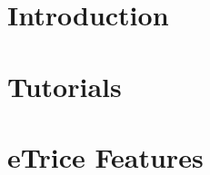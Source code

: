 \documentclass[a4paper,oneside,10pt]{book}
\title{\Huge \eTrice}
\author{\eTrice{} committers and contributors}
\begin{document}
\maketitle

\tableofcontents

\chapter{Introduction}




\chapter{Tutorials}












\chapter{eTrice{} Features}


%
%
%



\end{document}

